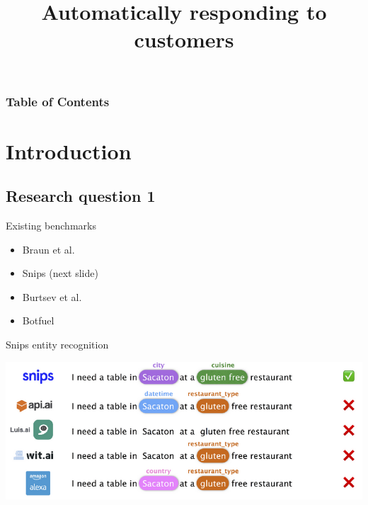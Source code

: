 \documentclass[pdf]{beamer}
\title{Automatically responding to customers}
\begin{document}
\begin{frame}
  \titlepage
\end{frame}

\begin{frame}
  \frametitle{Table of Contents}
  \tableofcontents[hideothersubsections]
\end{frame}

\section{Introduction}
\subsection{Research question 1}
\begin{frame}{Existing benchmarks}
  \begin{itemize}
  \item Braun et al.
  \item Snips (next slide)
  \item Burtsev et al.
  \item Botfuel
  \end{itemize}
\end{frame}

\begin{frame}{Snips entity recognition}
  \begin{center}
\includegraphics[width=\textwidth]{figures/snips_ner.png}
  \end{center}
\end{frame}
\end{document}

